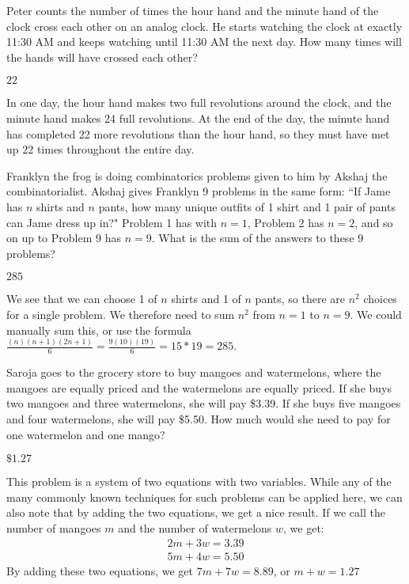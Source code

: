 \documentclass[11pt]{article}
\begin{document}
\begin{problem} %
Peter counts the number of times the hour hand and the minute hand of the clock cross each other on an analog clock. He starts watching the clock at exactly 11:30 AM and keeps watching until 11:30 AM the next day. How many times will the hands will have crossed each other?
\end{problem}
\begin{answer}
$\boxed{22}$
\end{answer}
\begin{solution}
In one day, the hour hand makes two full revolutions around the clock, and the minute hand makes 24 full revolutions. At the end of the day, the minute hand has completed 22 more revolutions than the hour hand, so they must have met up $\boxed{22}$ times throughout the entire day.
\end{solution}

\begin{problem} %
Franklyn the frog is doing combinatorics problems given to him by Akshaj the combinatorialist. Akshaj gives Franklyn 9 problems in the same form: ``If Jame has $n$ shirts and $n$ pants, how many unique outfits of 1 shirt and 1 pair of pants can Jame dress up in?" Problem 1 has with $n=1$, Problem 2 has $n=2$, and so on up to Problem 9 has $n=9$. What is the sum of the answers to these 9 problems?
\end{problem}
\begin{answer}
$\boxed{285}$
\end{answer}
\begin{solution}
We see that we can choose 1 of $n$ shirts and 1 of $n$ pants, so there are $n^2$ choices for a single problem. We therefore need to sum $n^2$ from $n=1$ to $n=9$. We could manually sum this, or use the formula $\frac{(n)(n+1)(2n+1)}{6} = \frac{9(10)(19)}{6} =15*19=\boxed{285}$.
\end{solution}

\begin{problem} %
Saroja goes to the grocery store to buy mangoes and watermelons, where the mangoes are equally priced and the watermelons are equally priced. If she buys two mangoes and three watermelons, she will pay \$3.39. If she buys five mangoes and four watermelons, she will pay \$5.50. How much would she need to pay for one watermelon and one mango?
\end{problem}
\begin{answer}
$\boxed{\$1.27}$
\end{answer}
\begin{solution} This problem is a system of two equations with two variables. While any of the many commonly known techniques for such problems can be applied here, we can also note that by adding the two equations, we get a nice result. If we call the number of mangoes $m$ and the number of watermelons $w$, we get:
\begin{align*}
2m + 3w = 3.39\\
5m + 4w = 5.50
\end{align*}
By adding these two equations, we get $7m + 7w = 8.89$, or $m+w = \boxed{1.27}$
\end{solution}
\end{document}
